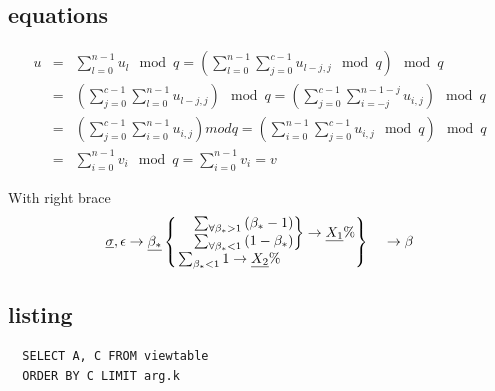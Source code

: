\subsection{equations}
\begin{eqnarray}
u &=& \sum_{l=0}^{n-1}{u_l} \mod{q} %
=(\sum_{l=0}^{n-1}{ \sum_{j=0}^{c-1}{u_{l-j, j}} \mod{q}})\mod{q} \nonumber \\
&=& (\sum_{j=0}^{c-1}{ \sum_{l=0}^{n-1}{ u_{l-j, j} } })\mod{q} %
=(\sum_{j=0}^{c-1}{ \sum_{i=-j}^{n-1-j}{ u_{i, j} } })\mod{q} \nonumber \\
&=& (\sum_{j=0}^{c-1}{\sum_{i=0}^{n-1}{ u_{i, j} } }) mod q
= (\sum_{i=0}^{n-1}{ \sum_{j=0}^{c-1}{ u_{i, j} }\mod{q} })\mod{q} \nonumber \\
&=& \sum_{i=0}^{n-1}{ v_i }\mod{q} = \sum_{i=0}^{n-1}{ v_i } = v
\end{eqnarray}

With right brace
\begin{eqnarray}
\underline{\sigma}, \epsilon \rightarrow{}\underline{\beta_*}
\begin{cases}
\begin{rcases}
\begin{rcases}
& \sum_{\forall\beta_*>1}{(\beta_* - 1)} \\
& \sum_{\forall\beta_*<1}{(1 - \beta_*)} \\  
\end{rcases} \rightarrow{} \underline{X_1}\% \\
\sum_{\beta_*<1}{1} \rightarrow{} \underline{X_2}\%
\end{rcases}
\end{cases}
 \rightarrow{\beta}
\end{eqnarray}

\subsection{listing}
\lstset{frame=lrbt,xleftmargin=\fboxsep,xrightmargin=-\fboxsep} %
\begin{lstlisting}
  SELECT A, C FROM viewtable
  ORDER BY C LIMIT arg.k
\end{lstlisting}

